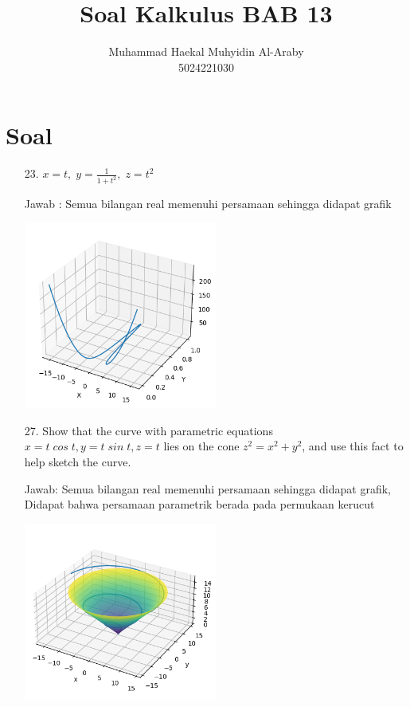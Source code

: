 \documentclass[twoside]{scrarticle}
\begin{document}
\title{Soal Kalkulus BAB 13}
\author{Muhammad Haekal Muhyidin Al-Araby \protect\\ 5024221030}

\maketitle

\section*{Soal}
\begin{enumerate}
\item[23.] $x = t,\;y = \frac{1}{1 + t^2},\;z = t^2$

Jawab : Semua bilangan real memenuhi persamaan sehingga didapat grafik

\begin{minipage}{\linewidth}
    \includegraphics[width=0.5\textwidth]{image2.png}
    \centering
\end{minipage}
\item[27.] Show that the curve with parametric equations $x = t\;cos\;t,y=t\;sin\;t, z=t$ 
lies on the cone $z^2 = x^2 + y^2$, and use this fact to help sketch the curve.

Jawab: Semua bilangan real memenuhi persamaan sehingga didapat grafik, Didapat
bahwa persamaan parametrik berada pada permukaan kerucut

\begin{minipage}{\linewidth}
    \includegraphics[width=0.5\textwidth]{27.png}
    \centering
\end{minipage}


\end{enumerate}
\end{document}

